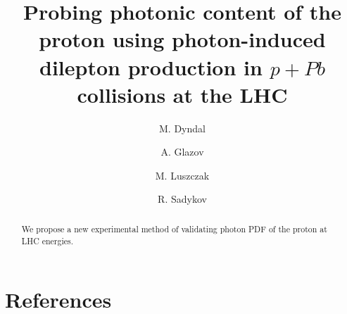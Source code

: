 \documentclass[preprint,10pt]{elsarticle}
\begin{document}
\begin{frontmatter}
\title{Probing photonic content of the proton using photon-induced dilepton production in $p+Pb$ collisions at the LHC}


\author{M. Dyndal}
\address{DESY}
\author{A. Glazov}
\address{DESY}
\author{M. Luszczak}
\address{...}
\author{R. Sadykov}
\address{...}



\begin{abstract}
We propose a new experimental method of validating photon PDF of the proton at LHC energies.
\end{abstract}



\end{frontmatter}












\section*{References}


\end{document}

